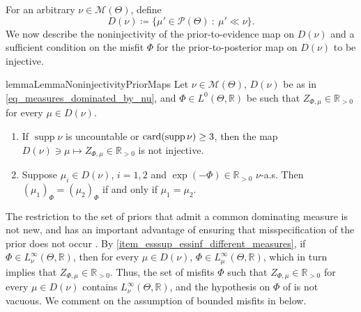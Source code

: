 \documentclass[a4paper]{scrartcl}
\theoremstyle{definition}
\numberwithin{equation}{section}
\newcommand{\R}{\mathbb{R}}
\newcommand{\card}[1]{\textup{card}({#1})}
\DeclareMathOperator{\supp}{supp}
\begin{document}
For an arbitrary $\nu\in\mathcal{M}(\Theta)$, define
\begin{equation}
 \label{eq_measures_dominated_by_nu}
 D(\nu)\coloneqq \{ \mu'\in\mathcal{P}(\Theta)\ :\ \mu'\ll\nu \}.
\end{equation}
We now describe the noninjectivity of the prior-to-evidence map on $D(\nu)$ and a sufficient condition on the misfit $\Phi$ for the prior-to-posterior map on $D(\nu)$ to be injective.
\begin{restatable}{lemma}{LemmaNoninjectivityPriorMaps}
\label{lemma_noninjectivity_of_prior_maps}
 Let $\nu\in\mathcal{M}(\Theta)$, $D(\nu)$ be as in \eqref{eq_measures_dominated_by_nu}, and $\Phi\in L^0(\Theta,\R)$ be such that $Z_{\Phi,\mu}\in \R_{>0}$ for every $\mu\in D(\nu)$.
 \begin{enumerate}
  \item \label{item_lemma_noninjectivity_of_prior_maps_noninjective}
  If $\supp{\nu}$ is uncountable or $\card{\supp{\nu}}\geq 3$, then the map $D(\nu)\ni \mu\mapsto Z_{\Phi,\mu}\in\R_{>0}$ is not injective.
  \item \label{item_lemma_noninjectivity_of_prior_maps_equivalent_condition_for_agreement}
  Suppose $\mu_i\in D(\nu)$, $i=1,2$ and $\exp(-\Phi)\in\R_{>0}$ $\nu$-a.s. 
 Then $(\mu_1)_\Phi=(\mu_2)_\Phi$ if and only if $\mu_1=\mu_2$.
 \end{enumerate}
\end{restatable}
The restriction to the set of priors that admit a common dominating measure is not new, and has an important advantage of ensuring that misspecification of the prior does not occur \cite[pp.6-7]{GhosalvanderVaart2017}.
By \ref{item_esssup_essinf_different_measures}, if $\Phi\in L^\infty_\nu(\Theta,\R)$, then for every $\mu\in D(\nu)$, $\Phi \in L^\infty_\mu(\Theta,\R)$, which in turn implies that $Z_{\Phi,\mu}\in\R_{>0}$. Thus, the set of misfits $\Phi$ such that $Z_{\Phi,\mu}\in\R_{>0}$ for every $\mu\in D(\nu)$ contains $L^\infty_\nu(\Theta,\R)$, and the hypothesis on $\Phi$ of  is not vacuous.
We comment on the assumption of bounded misfits in  below.
\end{document}
